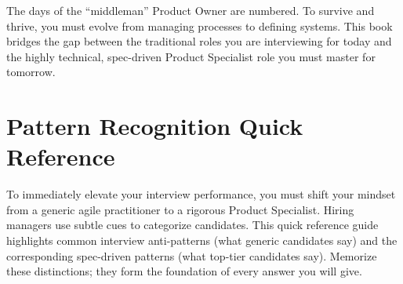 \documentclass[
  11pt,
  openany,
  oneside]{book}
\begin{document}
The days of the ``middleman'' Product Owner are numbered. To survive and
thrive, you must evolve from managing processes to defining systems.
This book bridges the gap between the traditional roles you are
interviewing for today and the highly technical, spec-driven Product
Specialist role you must master for tomorrow.

\section{Pattern Recognition Quick
Reference}\label{pattern-recognition-quick-reference}

To immediately elevate your interview performance, you must shift your
mindset from a generic agile practitioner to a rigorous Product
Specialist. Hiring managers use subtle cues to categorize candidates.
This quick reference guide highlights common interview anti-patterns
(what generic candidates say) and the corresponding spec-driven patterns
(what top-tier candidates say). Memorize these distinctions; they form
the foundation of every answer you will give.
\end{document}
